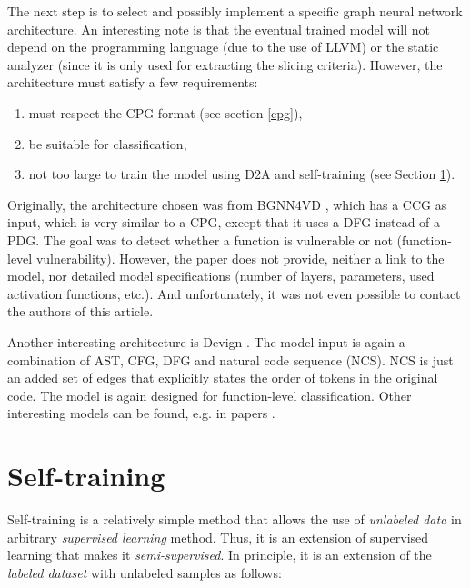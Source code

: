 The next step is to select and possibly implement a specific graph neural network architecture. An interesting note is that the eventual trained model will not depend on the programming language (due to the use of LLVM) or the static analyzer (since it is only used for extracting the slicing criteria). However, the architecture must satisfy a few requirements:
\begin{enumerate}
    \item must respect the CPG format (see section \ref{cpg}),
    \item be suitable for classification,
    \item not too large to train the model using D2A and self-training (see Section \ref{self-training}).
\end{enumerate}

Originally, the architecture chosen was from BGNN4VD \cite{GNN1-cao2021bgnn4vd}, which has a CCG as input, which is very similar to a CPG, except that it uses a DFG instead of a PDG. The goal was to detect whether a function is vulnerable or not (function-level vulnerability). However, the paper does not provide, neither a link to the model, nor detailed model specifications (number of layers, parameters, used activation functions, etc.). And unfortunately, it was not even possible to contact the authors of this article.

Another interesting architecture is Devign \cite{GNN2-zhou2019devign}. The model input is again a combination of AST, CFG, DFG and natural code sequence (NCS). NCS is just an added set of edges that explicitly states the order of tokens in the original code. The model is again designed for function-level classification. Other interesting models can be found, e.g. in papers \cite{GNN3-cheng2021deepwukong, GNN8-RNN-fang2022jstrong}.


\section{Self-training}
\label{self-training}
Self-training \cite{self-traning-webpage} is a relatively simple method that allows the use of \textit{unlabeled data} in arbitrary \textit{supervised learning} method. Thus, it is an extension of supervised learning that makes it \textit{semi-supervised}. In principle, it is an extension of the \textit{labeled dataset} with unlabeled samples as follows:

